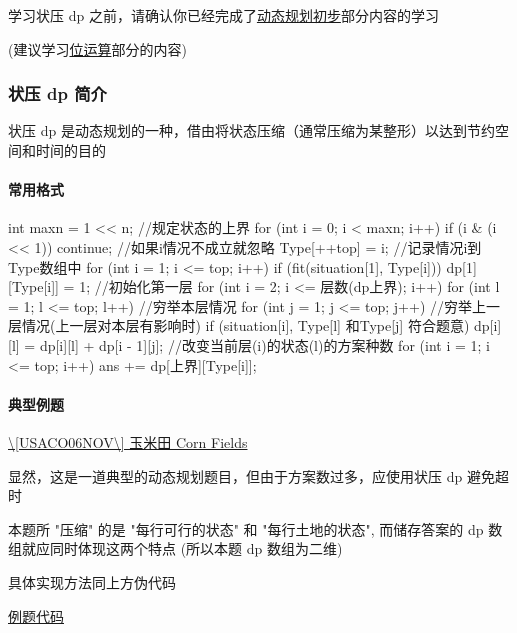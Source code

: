 
学习状压 dp 之前，请确认你已经完成了\href{/dp/}{动态规划初步}部分内容的学习

(建议学习\href{/math/bit/}{位运算}部分的内容)

\subsubsection{状压 dp 简介}

状压 dp 是动态规划的一种，借由将状态压缩（通常压缩为某整形）以达到节约空间和时间的目的

\paragraph{常用格式}

\begin{cppcode}
int maxn = 1 << n;  //规定状态的上界
for (int i = 0; i < maxn; i++) {
  if (i & (i << 1)) continue;  //如果i情况不成立就忽略
  Type[++top] = i;             //记录情况i到Type数组中
}
for (int i = 1; i <= top; i++) {
  if (fit(situation[1], Type[i])) dp[1][Type[i]] = 1;  //初始化第一层
}
for (int i = 2; i <= 层数(dp上界); i++) {
  for (int l = 1; l <= top; l++)  //穷举本层情况
    for (int j = 1; j <= top; j++)  //穷举上一层情况(上一层对本层有影响时)
      if (situation[i], Type[l] 和Type[j] 符合题意)
        dp[i][l] = dp[i][l] + dp[i - 1][j];  //改变当前层(i)的状态(l)的方案种数
}
for (int i = 1; i <= top; i++) ans += dp[上界][Type[i]];
\end{cppcode}

\paragraph{典型例题}

\href{https://www.luogu.org/problemnew/show/P1879}{\textbackslash{}[USACO06NOV\textbackslash{}] 玉米田 Corn Fields}

显然，这是一道典型的动态规划题目，但由于方案数过多，应使用状压 dp 避免超时

本题所 "压缩" 的是 "每行可行的状态" 和 "每行土地的状态", 而储存答案的 dp 数组就应同时体现这两个特点 (所以本题 dp 数组为二维)

具体实现方法同上方伪代码

\href{https://www.luogu.org/paste/kto3ua68}{例题代码}
